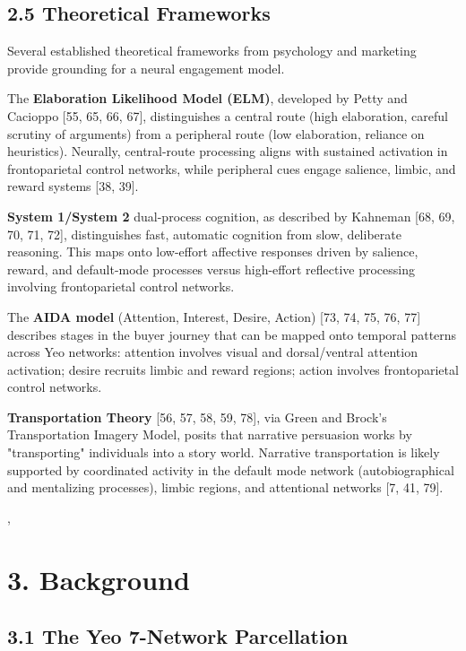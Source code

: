 \documentclass[11pt,letterpaper]{article}
\begin{document}
\subsection{2.5 Theoretical Frameworks}

Several established theoretical frameworks from psychology and marketing provide grounding for a neural engagement model.

The \textbf{Elaboration Likelihood Model (ELM)}, developed by Petty and Cacioppo [55, 65, 66, 67], distinguishes a central route (high elaboration, careful scrutiny of arguments) from a peripheral route (low elaboration, reliance on heuristics). Neurally, central-route processing aligns with sustained activation in frontoparietal control networks, while peripheral cues engage salience, limbic, and reward systems [38, 39].

\textbf{System 1/System 2} dual-process cognition, as described by Kahneman [68, 69, 70, 71, 72], distinguishes fast, automatic cognition from slow, deliberate reasoning. This maps onto low-effort affective responses driven by salience, reward, and default-mode processes versus high-effort reflective processing involving frontoparietal control networks.

The \textbf{AIDA model} (Attention, Interest, Desire, Action) [73, 74, 75, 76, 77] describes stages in the buyer journey that can be mapped onto temporal patterns across Yeo networks: attention involves visual and dorsal/ventral attention activation; desire recruits limbic and reward regions; action involves frontoparietal control networks.

\textbf{Transportation Theory} [56, 57, 58, 59, 78], via Green and Brock's Transportation Imagery Model, posits that narrative persuasion works by "transporting" individuals into a story world. Narrative transportation is likely supported by coordinated activity in the default mode network (autobiographical and mentalizing processes), limbic regions, and attentional networks [7, 41, 79].

, 

\section{3. Background}

\subsection{3.1 The Yeo 7-Network Parcellation}
\end{document}
